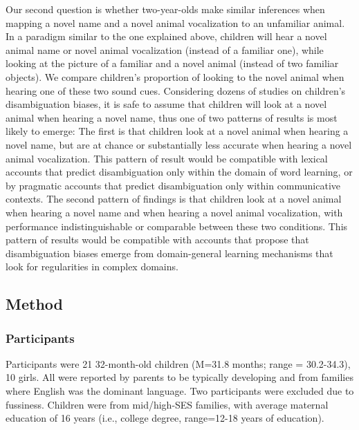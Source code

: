 \documentclass[english,floatsintext,man]{apa6}
\theoremstyle{definition}
\theoremstyle{definition}
\theoremstyle{definition}
\theoremstyle{remark}
\begin{document}
Our second question is whether two-year-olds make similar inferences
when mapping a novel name and a novel animal vocalization to an
unfamiliar animal. In a paradigm similar to the one explained above,
children will hear a novel animal name or novel animal vocalization
(instead of a familiar one), while looking at the picture of a familiar
and a novel animal (instead of two familiar objects). We compare
children's proportion of looking to the novel animal when hearing one of
these two sound cues. Considering dozens of studies on children's
disambiguation biases, it is safe to assume that children will look at a
novel animal when hearing a novel name, thus one of two patterns of
results is most likely to emerge: The first is that children look at a
novel animal when hearing a novel name, but are at chance or
substantially less accurate when hearing a novel animal vocalization.
This pattern of result would be compatible with lexical accounts that
predict disambiguation only within the domain of word learning, or by
pragmatic accounts that predict disambiguation only within communicative
contexts. The second pattern of findings is that children look at a
novel animal when hearing a novel name and when hearing a novel animal
vocalization, with performance indistinguishable or comparable between
these two conditions. This pattern of results would be compatible with
accounts that propose that disambiguation biases emerge from
domain-general learning mechanisms that look for regularities in complex
domains.

\subsection{Method}\label{method}

\subsubsection{Participants}\label{participants}

Participants were 21 32-month-old children (M=31.8 months; range =
30.2-34.3), 10 girls. All were reported by parents to be typically
developing and from families where English was the dominant language.
Two participants were excluded due to fussiness. Children were from
mid/high-SES families, with average maternal education of 16 years
(i.e., college degree, range=12-18 years of education).
\end{document}
